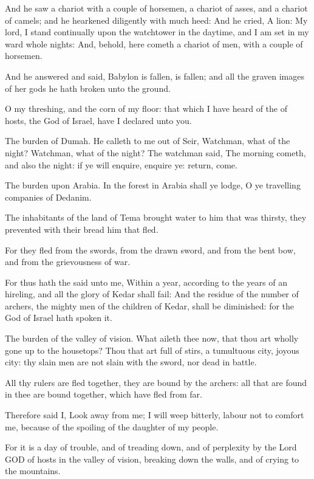 \Verse And he saw a chariot with a couple of horsemen, a chariot of asses, and a chariot of camels; and he hearkened diligently with much heed: \Verse And he cried, A lion: My lord, I stand continually upon the watchtower in the daytime, and I am set in my ward whole nights: \Verse And, behold, here cometh a chariot of men, with a couple of horsemen.

And he answered and said, Babylon is fallen, is fallen; and all the graven images of her gods he hath broken unto the ground.

\Verse O my threshing, and the corn of my floor: that which I have heard of the \LORD of hosts, the God of Israel, have I declared unto you.

\Verse The burden of Dumah. He calleth to me out of Seir, Watchman, what of the night? Watchman, what of the night?  \Verse The watchman said, The morning cometh, and also the night: if ye will enquire, enquire ye: return, come.

\Verse The burden upon Arabia. In the forest in Arabia shall ye lodge, O ye travelling companies of Dedanim.

\Verse The inhabitants of the land of Tema brought water to him that was thirsty, they prevented with their bread him that fled.

\Verse For they fled from the swords, from the drawn sword, and from the bent bow, and from the grievousness of war.

\Verse For thus hath the \LORD said unto me, Within a year, according to the years of an hireling, and all the glory of Kedar shall fail: \Verse And the residue of the number of archers, the mighty men of the children of Kedar, shall be diminished: for the \LORD God of Israel hath spoken it.


\Chapter
\Verse The burden of the valley of vision. What aileth thee now, that thou art wholly gone up to the housetops?  \Verse Thou that art full of stirs, a tumultuous city, joyous city: thy slain men are not slain with the sword, nor dead in battle.

\Verse All thy rulers are fled together, they are bound by the archers: all that are found in thee are bound together, which have fled from far.

\Verse Therefore said I, Look away from me; I will weep bitterly, labour not to comfort me, because of the spoiling of the daughter of my people.

\Verse For it is a day of trouble, and of treading down, and of perplexity by the Lord GOD of hosts in the valley of vision, breaking down the walls, and of crying to the mountains.

